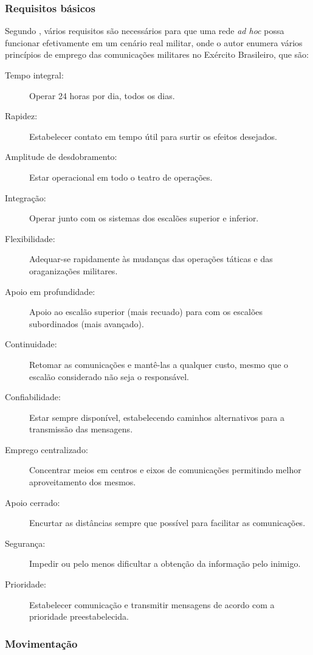 \subsubsection{Requisitos b\'asicos}
Segundo \cite{salles}, v\'arios requisitos s\~ao necess\'arios para que uma rede \textit{ad hoc} possa funcionar efetivamente em um cen\'ario real militar, onde o autor enumera v\'arios princ\'ipios de emprego das comunica\c{c}\~oes militares no Ex\'ercito Brasileiro, que s\~ao:
\begin{description}
	\item[Tempo integral:] Operar 24 horas por dia, todos os dias.
	\item[Rapidez:] Estabelecer contato em tempo \'util para surtir os efeitos desejados.
	\item[Amplitude de desdobramento:] Estar operacional em todo o teatro de opera\c{c}\~oes.
	\item[Integra\c{c}\~ao:] Operar junto com os sistemas dos escal\~oes superior e inferior.
	\item[Flexibilidade:] Adequar-se rapidamente \`as mudan\c{c}as das opera\c{c}\~oes t\'aticas e das oraganiza\c{c}\~oes militares.
	\item[Apoio em profundidade:] Apoio ao escal\~ao superior (mais recuado) para com os escal\~oes subordinados (mais avan\c{c}ado).
	\item[Continuidade:] Retomar as comunica\c{c}\~oes e mant\^e-las a qualquer custo, mesmo que o escal\~ao considerado n\~ao seja o respons\'avel.
	\item[Confiabilidade:] Estar sempre dispon\'ivel, estabelecendo caminhos alternativos para a transmiss\~ao das mensagens.
	\item[Emprego centralizado:] Concentrar meios em centros e eixos de comunica\c{c}\~oes permitindo melhor aproveitamento dos mesmos.
	\item[Apoio cerrado:] Encurtar as dist\^ancias sempre que poss\'ivel para facilitar as comunica\c{c}\~oes.
	\item[Seguran\c{c}a:] Impedir ou pelo menos dificultar a obten\c{c}\~ao da informa\c{c}\~ao pelo inimigo.
	\item[Prioridade:] Estabelecer comunica\c{c}\~ao e transmitir mensagens de acordo com a prioridade preestabelecida.
\end{description}


\subsubsection{Movimenta\c{c}\~ao}



